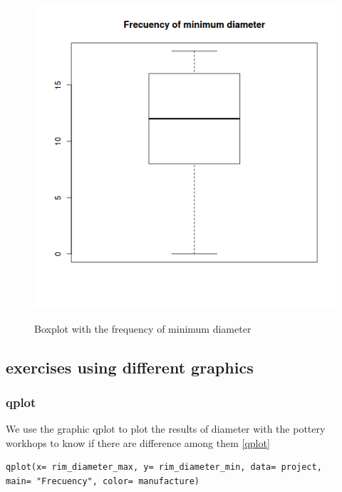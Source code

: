 \documentclass[10pt,a4paper]{article}
\begin{document}
\begin{figure}[hdp]
\centering
\includegraphics[scale=0.30]{boxplotmin.png}
\label{boxmin}
\caption{Boxplot with the frequency of minimum diameter}
\end{figure} 



\subsection{exercises using different graphics}

\subsubsection{qplot}

We use the graphic qplot to plot the results of diameter with the pottery workhops to know if there are difference among them \ref{qplot}

\begin{verbatim}
qplot(x= rim_diameter_max, y= rim_diameter_min, data= project, 
main= "Frecuency", color= manufacture) 
\end{verbatim}
\end{document}
